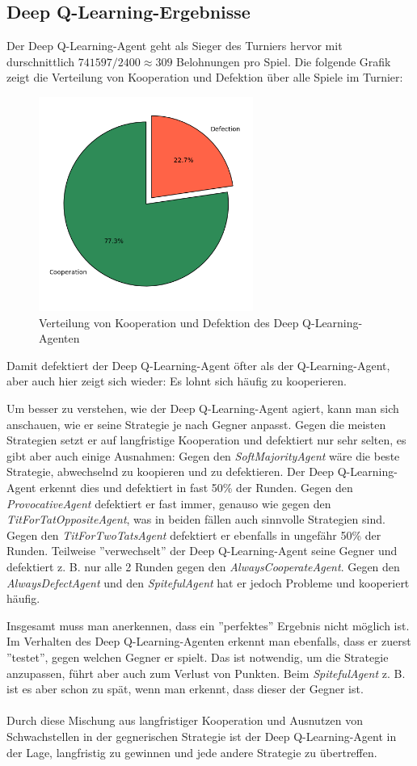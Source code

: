 \subsection{Deep Q-Learning-Ergebnisse}
Der Deep Q-Learning-Agent geht als Sieger des Turniers hervor mit durschnittlich $741597 / 2400 \approx 309$ Belohnungen pro Spiel. 
Die folgende Grafik zeigt die Verteilung von Kooperation und Defektion über alle Spiele im Turnier:
\begin{figure}[H]
    \centering
    \includegraphics[width=7cm]{../poster/logos/deepqPie.png}
    \caption{Verteilung von Kooperation und Defektion des Deep Q-Learning-Agenten}
    \label{fig:deepqverteilung}
\end{figure}
Damit defektiert der Deep Q-Learning-Agent öfter als der Q-Learning-Agent, aber auch hier zeigt sich wieder: Es lohnt sich 
häufig zu kooperieren. 

Um besser zu verstehen, wie der Deep Q-Learning-Agent agiert, kann man sich anschauen, wie er seine Strategie
je nach Gegner anpasst. Gegen die meisten Strategien setzt er auf langfristige Kooperation und defektiert nur sehr selten, es gibt
aber auch einige Ausnahmen:
Gegen den \textit{SoftMajorityAgent} wäre die beste Strategie, abwechselnd zu koopieren und zu defektieren. Der
Deep Q-Learning-Agent erkennt dies und defektiert in fast 50\% der Runden. Gegen den \textit{ProvocativeAgent} defektiert er
fast immer, genauso wie gegen den \textit{TitForTatOppositeAgent}, was in beiden fällen auch sinnvolle Strategien sind. Gegen den 
\textit{TitForTwoTatsAgent} defektiert er ebenfalls in ungefähr 50\% der Runden. Teilweise ''verwechselt'' der Deep Q-Learning-Agent
seine Gegner und defektiert z. B. nur alle 2 Runden gegen den \textit{AlwaysCooperateAgent}. Gegen den \textit{AlwaysDefectAgent}
und den \textit{SpitefulAgent} hat er jedoch Probleme und kooperiert häufig. 

Insgesamt muss man anerkennen, dass ein ''perfektes'' Ergebnis nicht möglich ist. Im Verhalten des Deep Q-Learning-Agenten erkennt man ebenfalls,
dass er zuerst ''testet'', gegen welchen Gegner er spielt. Das ist notwendig, um die Strategie anzupassen, führt aber auch zum Verlust von Punkten.
Beim \textit{SpitefulAgent} z. B. ist es aber schon zu spät, wenn man erkennt, dass dieser der Gegner ist. \\ \\
Durch diese Mischung aus langfristiger Kooperation und Ausnutzen von Schwachstellen in der gegnerischen Strategie ist der 
Deep Q-Learning-Agent in der Lage, langfristig zu gewinnen und jede andere Strategie zu übertreffen.